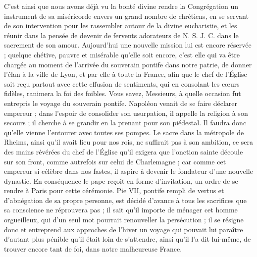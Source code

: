 C'est ainsi que nous avons déjà vu la bonté divine rendre la Congrégation un instrument de sa miséricorde envers un grand nombre de chrétiens, en se servant de son intervention pour les rassembler autour de la divine eucharistie, et les réunir dans la pensée de devenir de fervents adorateurs de N. S. J. C. dans le sacrement de son amour. Aujourd'hui une nouvelle mission lui est encore réservée ; quelque chétive, pauvre et misérable qu'elle soit encore, c'est elle qui va être chargée au moment de l'arrivée du souverain pontife dans notre patrie, de donner l'élan à la ville de Lyon, et par elle à toute la France, afin que le chef de l'Église soit reçu partout avec cette effusion de sentiments, qui en consolant les cœurs fidèles, ranimera la foi des foibles. Vous savez, Messieurs, à quelle occasion fut entrepris le voyage du souverain pontife. Napoléon venait de se faire déclarer empereur ; dans l'espoir de consolider son usurpation, il appelle la religion à son secours ; il cherche à se grandir en la prenant pour son piédestal. Il faudra donc qu'elle vienne l'entourer avec toutes ses pompes. Le sacre dans la métropole de Rheims, ainsi qu'il avait lieu pour nos rois, ne suffirait pas à son ambition, ce sera des mains révérées du chef de l'Église qu'il exigera que l'onction sainte découle sur son front, comme autrefois sur celui de Charlemagne ; car comme cet empereur si célèbre dans nos fastes, il aspire à devenir le fondateur d'une nouvelle dynastie. En conséquence le pape reçoit en forme d'invitation, un ordre de se rendre à Paris pour cette cérémonie. Pie VII, pontife
rempli de vertus et d'abnégation de sa propre personne, est décidé d'avance à tous les sacrifices que sa conscience ne réprouvera pas ; il sait qu'il importe de ménager cet homme orgueilleux, qui d'un seul mot pourrait renouveller la persécution ; il se résigne donc et entreprend aux approches de l'hiver un voyage qui pouvait lui paraître d'autant plus pénible qu'il était loin de s'attendre, ainsi qu'il l'a dit lui-même, de trouver encore tant de foi, dans notre malheureuse France.

